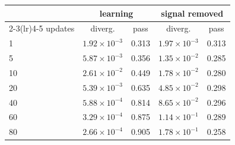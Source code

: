 \setlength{\tabcolsep}{3.5pt}
\begin{tabular}{@{}lcccc@{}}
\toprule
& \multicolumn{2}{c}{learning} & \multicolumn{2}{c}{signal removed} \\
\cmidrule(lr){2-3}\cmidrule(lr){4-5}
updates & diverg. & pass & diverg. & pass \\
\midrule
1 & $1.92\times10^{-3}$ & 0.313 & $1.97\times10^{-3}$ & 0.313 \\
5 & $5.87\times10^{-3}$ & 0.356 & $1.35\times10^{-2}$ & 0.285 \\
10 & $2.61\times10^{-2}$ & 0.449 & $1.78\times10^{-2}$ & 0.280 \\
20 & $5.39\times10^{-3}$ & 0.635 & $4.85\times10^{-2}$ & 0.298 \\
40 & $5.88\times10^{-4}$ & 0.814 & $8.65\times10^{-2}$ & 0.296 \\
60 & $3.29\times10^{-4}$ & 0.875 & $1.14\times10^{-1}$ & 0.289 \\
80 & $2.66\times10^{-4}$ & 0.905 & $1.78\times10^{-1}$ & 0.258 \\
\bottomrule
\end{tabular}